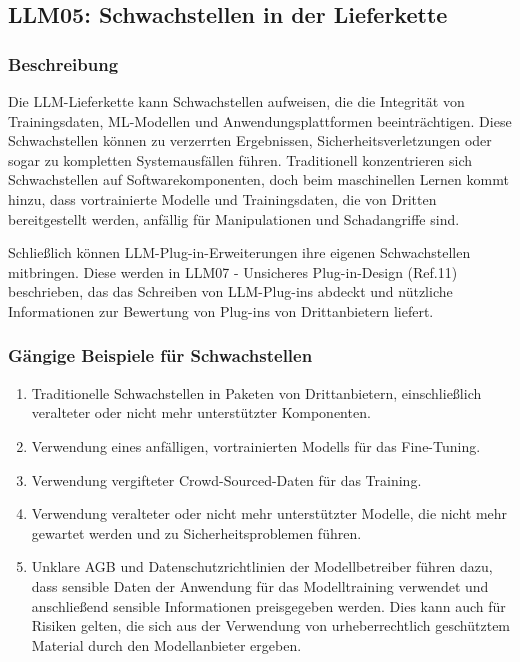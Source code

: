 \documentclass[
]{article}
\author{}
\date{}
\providecommand{\tightlist}{%
  \setlength{\itemsep}{0pt}\setlength{\parskip}{0pt}}
\begin{document}
\subsection{LLM05: Schwachstellen in der
Lieferkette}\label{llm05-schwachstellen-in-der-lieferkette}

\subsubsection{Beschreibung}\label{beschreibung}

Die LLM-Lieferkette kann Schwachstellen aufweisen, die die Integrität
von Trainingsdaten, ML-Modellen und Anwendungsplattformen
beeinträchtigen. Diese Schwachstellen können zu verzerrten Ergebnissen,
Sicherheitsverletzungen oder sogar zu kompletten Systemausfällen führen.
Traditionell konzentrieren sich Schwachstellen auf Softwarekomponenten,
doch beim maschinellen Lernen kommt hinzu, dass vortrainierte Modelle
und Trainingsdaten, die von Dritten bereitgestellt werden, anfällig für
Manipulationen und Schadangriffe sind.

Schließlich können LLM-Plug-in-Erweiterungen ihre eigenen Schwachstellen
mitbringen. Diese werden in LLM07 - Unsicheres Plug-in-Design (Ref.11)
beschrieben, das das Schreiben von LLM-Plug-ins abdeckt und nützliche
Informationen zur Bewertung von Plug-ins von Drittanbietern liefert.

\subsubsection{Gängige Beispiele für
Schwachstellen}\label{guxe4ngige-beispiele-fuxfcr-schwachstellen}

\begin{enumerate}
\def\labelenumi{\arabic{enumi}.}
\tightlist
\item
  Traditionelle Schwachstellen in Paketen von Drittanbietern,
  einschließlich veralteter oder nicht mehr unterstützter Komponenten.
\item
  Verwendung eines anfälligen, vortrainierten Modells für das
  Fine-Tuning.
\item
  Verwendung vergifteter Crowd-Sourced-Daten für das Training.
\item
  Verwendung veralteter oder nicht mehr unterstützter Modelle, die nicht
  mehr gewartet werden und zu Sicherheitsproblemen führen.
\item
  Unklare AGB und Datenschutzrichtlinien der Modellbetreiber führen
  dazu, dass sensible Daten der Anwendung für das Modelltraining
  verwendet und anschließend sensible Informationen preisgegeben werden.
  Dies kann auch für Risiken gelten, die sich aus der Verwendung von
  urheberrechtlich geschütztem Material durch den Modellanbieter
  ergeben.
\end{enumerate}
\end{document}
